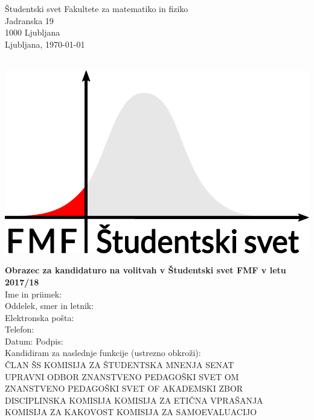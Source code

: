 \documentclass[a4paper,oneside,12pt]{article}
\begin{document}
\begin{minipage}[t]{0.7\linewidth}
Študentski svet Fakultete za matematiko in fiziko \\
Jadranska 19 \\
1000 Ljubljana \\

Ljubljana, \today\\
\end{minipage}%
\begin{minipage}[t]{0.3\linewidth}
  \mbox{} \\[-15pt]
  \hspace*{\fill} \includegraphics[width=0.9\linewidth]{ssfmf_logo_col.pdf}
\end{minipage}

\textbf{Obrazec za kandidaturo na volitvah v Študentski svet FMF v letu 2017/18} \\[-0.5ex]

Ime in priimek: \hrulefill \\[3ex]
Oddelek, smer in letnik: \hrulefill \\[3ex]
Elektronska pošta: \hrulefill \\[3ex]
Telefon: \hrulefill \\[3ex]
Datum: \hrulefill \hspace{1em} Podpis: \hrulefill \\[-2ex]

Kandidiram za naslednje funkcije (ustrezno obkroži): \\[1ex]
ČLAN ŠS \hfill
KOMISIJA ZA ŠTUDENTSKA MNENJA \hfill
SENAT \\[1ex]
UPRAVNI ODBOR \hfill
ZNANSTVENO PEDAGOŠKI SVET OM \\[1ex]
ZNANSTVENO PEDAGOŠKI SVET OF \hfill
AKADEMSKI ZBOR \\[1ex]
DISCIPLINSKA KOMISIJA \hfill
KOMISIJA ZA ETIČNA VPRAŠANJA \\[1ex]
KOMISIJA ZA KAKOVOST \hfill
KOMISIJA ZA SAMOEVALUACIJO
\end{document}
